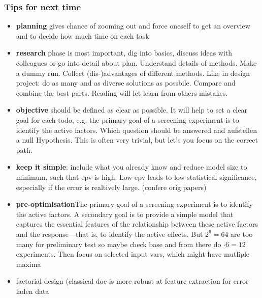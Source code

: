 \subsubsection{Tips for next time}
\begin{itemize}
    \item \textbf{planning} gives chance of zooming out and force oneself to get an overview and to decide how much time on each task
    \item \textbf{research} phase is most important, dig into basics, discuss ideas with colleagues or go into detail about plan. Understand details of methods. Make a dummy run. Collect (dis-)advantages of different methods. Like in design project: do as many and as diverse solutions as possbile. Compare and combine the best parts. Reading will let learn from others mistakes. \\ 
    \item \textbf{objective} should be defined as clear as possible. It will help to set a clear goal for each todo, e.g. the primary goal of a screening experiment is to identify the active factors.\cite{miller2001using} Which question should be answered and aufstellen a null Hypothesis. This is often very trivial, but let's you focus on the correct path. 
    \item \textbf{keep it simple}: include what you already know and reduce model size to minimum, such that \gls{epv} is high.  Low \gls{epv} leads to low statistical significance, especially if the error is realtively large. (confere orig papers)
    \item \textbf{pre-optimisation}{The primary goal of a screening experiment is to identify the active factors. A secondary goal is to provide a simple model that captures the essential features of the relationship between these active factors and the response—that is, to identify the active effects. \cite{miller2001using}} But $2^6=64$ are too many for preliminary test so maybe check base and from there do $\cdot6=12$ experiments. Then focus on selected input vars, which might have mutliple maxima \\ 
    \item factorial design (classical \gls{doe} is more robust at feature extraction for error laden data \cite{giunta2003overview}
%
\end{itemize}
